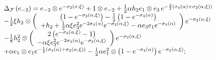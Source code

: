 \documentclass[a4paper,12pt,showkeys]{article}
\begin{document}
\[
\begin{array}{l}
\Delta _{{\cal F}}\left(  e_{-2} \right) = e_{-2} \otimes e^{-{\bf \sigma }%
_{2}(\sigma,\xi)}+1\otimes  e_{-2} + \frac{1}{2}\alpha  h_2
 e_1 \otimes  e_3\,  e^{-\frac{3}{2}%
\left( {\bf  \sigma }_{4} (\alpha) +{\bf  \sigma }_{2} (\alpha,
\xi ) \right) }
\\
 - \frac{1}{2} \xi  h_2 \otimes \left(
\begin{array}{c}
\left( 1-e^{-{\bf  \sigma }_{2} (\alpha, \xi ) }\right) -\frac{1}{2}\left( 1-e^{-{\bf %
 \sigma }_{4} (\alpha) }\right)  \\
+  h_2 +\frac{1}{2}\alpha \xi
e_3 ^{2}e^{-2{\bf  \sigma }_{4} (\alpha) }e^{-{\bf %
 \sigma }_{2} (\alpha, \xi ) }-
 \alpha  e_3   e_1 e^{-{\bf  \sigma }_{4} (\alpha) }%
\end{array}%
\right) e^{-{\bf  \sigma }_{2} (\alpha, \xi ) } \\
- \frac{1}{8} h_2 ^{2}\otimes \left(
\begin{array}{c}
2\left( e^{-{\bf  \sigma }_{2} (\alpha, \xi ) }-1\right)  \\
- \alpha \xi  e_3 ^{2}e^{-2{\bf  \sigma }_{4} (\alpha) }e^{-{\bf  \sigma }_{2} (\alpha, \xi ) }%
\end{array}%
\right) e^{-{\bf  \sigma }_{2} (\alpha, \xi ) }
\\
+ \alpha    e_1 \otimes   e_1 e^{-\frac{1}{2}\left( {\bf  \sigma }_{4} (\alpha) +{\bf %
 \sigma }_{2} (\alpha, \xi ) \right) }-\frac{1}{2}\alpha   e_1 ^{2}\otimes \left( 1-e^{-{\bf %
 \sigma }_{4} (\alpha) }\right) e^{-{\bf  \sigma }_{2} (\alpha, \xi ) };%
\end{array}%
\]
\end{document}

